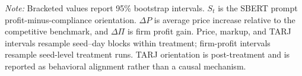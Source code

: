 \begin{table}[t]
\vspace{1.0em}
\begin{minipage}{0.90\textwidth}
\footnotesize
\emph{Note:} Bracketed values report 95\% bootstrap intervals. $S_t$ is the SBERT prompt profit-minus-compliance orientation. $\Delta P$ is average price increase relative to the competitive benchmark, and $\Delta \Pi$ is firm profit gain. Price, markup, and TARJ intervals resample seed--day blocks within treatment; firm-profit intervals resample seed-level treatment runs. TARJ orientation is post-treatment and is reported as behavioral alignment rather than a causal mechanism.
\end{minipage}
\vspace{-0.4em}
\end{table}